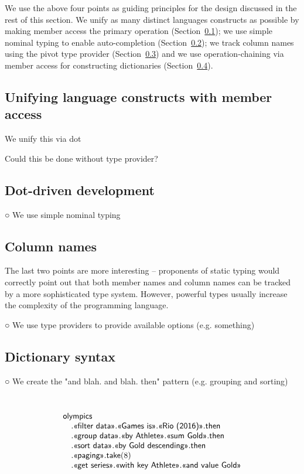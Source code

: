 \documentclass[a4paper,UKenglish]{lipics-v2016}
\newcommand{\ident}[1]{\textnormal{\sffamily #1}}
\newcommand{\qident}[1]{\textnormal{\sffamily \guillemotleft #1\guillemotright}}
\begin{document}
\noindent
We use the above four points as guiding principles for the design discussed in the rest of this
section. We unify as many distinct languages constructs as possible by making member
access the primary operation (Section~\ref{sec:analysis-dot}); we use simple nominal typing to
enable auto-completion (Section~\ref{sec:analysis-auto}); we track column names using the pivot
type provider (Section~\ref{sec:analysis-col}) and we use operation-chaining via member access
for constructing dictionaries (Section~\ref{sec:analysis-and}).


\subsection{Unifying language constructs with member access}
\label{sec:analysis-dot}

We unify this via dot

Could this be done without type provider?
  
  
\subsection{Dot-driven development}
\label{sec:analysis-auto}

  ○ We use simple nominal typing
\subsection{Column names}
\label{sec:analysis-col}


The last two points are more interesting -- proponents of static typing would correctly
point out that both member names and column names can be tracked by a more sophisticated type
system. However, powerful types usually increase the complexity of the programming language.

  ○ We use type providers to provide available options
  (e.g. something)
\subsection{Dictionary syntax}
\label{sec:analysis-and}
  ○ We create the "and blah. and blah. then" pattern
  (e.g. grouping and sorting)


~
\begin{equation*}
\begin{array}{l}
\ident{olympics}\\
\quad.\qident{filter data}.\qident{Games is}.\qident{Rio (2016)}.\ident{then}\\
\quad.\qident{group data}.\qident{by Athlete}.\qident{sum Gold}.\ident{then}\\
\quad.\qident{sort data}.\qident{by Gold descending}.\ident{then}\\
\quad.\qident{paging}.\ident{take}(8)\\
\quad.\qident{get series}.\qident{with key Athlete}.\qident{and value Gold}
\end{array}
\end{equation*}
\end{document}
